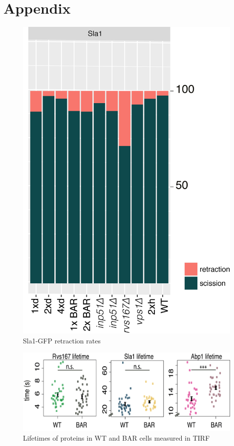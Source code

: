 \chapter{Appendix} %
\label{Ch:Appendix}

\begin{figure}[H]
\includegraphics[scale=1.5]{figures/appendix/retraction_rates_all}
\caption{Sla1-GFP retraction rates}
\end{figure}


\begin{figure}[H]
	\hspace{-1cm}
	\includegraphics[scale=0.4]{figures/appendix/delsh3_5}
	\caption{Lifetimes of proteins in WT and BAR cells measured in TIRF}
\end{figure}